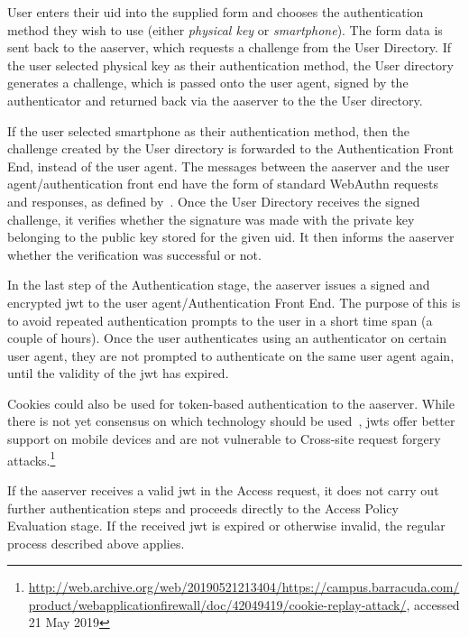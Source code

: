 User enters their \acrshort{uid} into the supplied form and chooses the authentication method they wish to use (either \textit{physical key} or \textit{smartphone}). The form data is sent back to the \acrshort{aaserver}, which requests a challenge from the User Directory. If the user selected physical key as their authentication method, the User directory generates a challenge, which is passed onto the user agent, signed by the authenticator and returned back via the \acrshort{aaserver} to the the User directory.

If the user selected smartphone as their authentication method, then the challenge created by the User directory is forwarded to the Authentication Front End, instead of the user agent. The messages between the \acrshort{aaserver} and the user agent/authentication front end have the form of standard WebAuthn requests and responses, as defined by~\cite{Balfanz2019Web1}. 
Once the User Directory receives the signed challenge, it verifies whether the signature was made with the private key belonging to the public key stored for the given \acrshort{uid}. It then informs the \acrshort{aaserver} whether the verification was successful or not.

In the last step of the Authentication stage, the \acrshort{aaserver} issues a signed and encrypted \acrshort{jwt} to the user agent/Authentication Front End. The purpose of this is to avoid repeated authentication prompts to the user in a short time span (a couple of hours). Once the user authenticates using an authenticator on certain user agent, they are not prompted to authenticate on the same user agent again, until the validity of the \acrshort{jwt} has expired.
 
Cookies could also be used for token-based authentication to the \acrshort{aaserver}. While there is not yet consensus on which technology should be used~\cite{Beltran2016CharacterizationProtocols, RajuRaghuwanshi2017JWTCookies}, \acrlong{jwt}s offer better support on mobile devices and are not vulnerable to Cross-site request forgery attacks.\footnote{\url{http://web.archive.org/web/20190521213404/https://campus.barracuda.com/product/webapplicationfirewall/doc/42049419/cookie-replay-attack/}, accessed 21 May 2019}

If the \acrshort{aaserver} receives a valid \acrshort{jwt} in the Access request, it does not carry out further authentication steps and proceeds directly to the Access Policy Evaluation stage. If the received \acrshort{jwt} is expired or otherwise invalid, the regular process described above applies.

